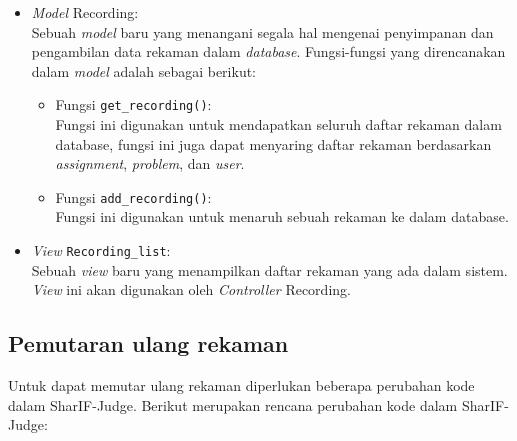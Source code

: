 \begin{itemize}
    \item \textit{Model} Recording: \\
    Sebuah \textit{model} baru yang menangani segala hal mengenai penyimpanan dan pengambilan data rekaman dalam \textit{database}. Fungsi-fungsi yang direncanakan dalam \textit{model} adalah sebagai berikut:
    \begin{itemize}
        \item Fungsi \verb|get_recording()|: \\
        Fungsi ini digunakan untuk mendapatkan seluruh daftar rekaman dalam database, fungsi ini juga dapat menyaring daftar rekaman berdasarkan \textit{assignment}, \textit{problem}, dan \textit{user}.
        \item Fungsi \verb|add_recording()|: \\
        Fungsi ini digunakan untuk menaruh sebuah rekaman ke dalam database.
    \end{itemize}
    \item \textit{View} \verb|Recording_list|: \\
    Sebuah \textit{view} baru yang menampilkan daftar rekaman yang ada dalam sistem. \textit{View} ini akan digunakan oleh \textit{Controller} Recording.
\end{itemize}

\subsection{Pemutaran ulang rekaman}

Untuk dapat memutar ulang rekaman diperlukan beberapa perubahan kode dalam SharIF-Judge. Berikut merupakan rencana perubahan kode dalam SharIF-Judge:

